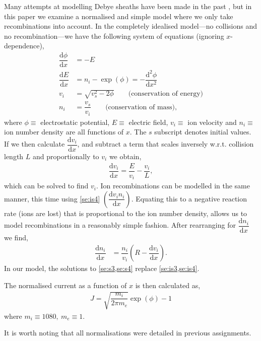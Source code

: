 \documentclass[aip,apl,reprint]{revtex4-1}
\newcommand{\difx}[1]{\dfrac{\mathrm{d}#1}{\mathrm{d}x}}
\newcommand{\ddifx}[1]{\dfrac{\mathrm{d}^{2}#1}{\mathrm{d}x^{2}}}
\begin{document}
	Many attempts at modelling Debye sheaths have been made in the past \cite{lpcs}, but in this paper we examine a normalised and simple model where we only take recombinations into account. In the completely idealised model---no collisions and no recombination---we have the following system of equations (ignoring $x$-dependence),
	\begin{subequations}
		\begin{align}
			\difx{\phi} &= -E \label{se:is1}\\
			\difx{E} &= n_{i} - \exp(\phi) = - \ddifx{\phi} \label{se:is2}\\
			v_{i} &= \sqrt{v_{s}^{2} - 2 \phi} \qquad \textrm{(conservation of energy)}\label{se:is3}\\
			n_{i} &= \dfrac{v_{s}}{v_{i}} \qquad \textrm{(conservation of mass)}\label{se:is4},
		\end{align}
	\end{subequations}
	where $\phi \equiv$ electrostatic potential, $E \equiv$ electric field, $v_{i} \equiv$ ion velocity and $n_{i} \equiv$ ion number density are all functions of $x$. The $s$ subscript denotes initial values. If we then calculate $\difx{v_{i}}$, and subtract a term that scales inversely w.r.t. collision length $L$ and proportionally to $v_{i}$ we obtain,
	\begin{align}
		\difx{v_{i}} = \dfrac{E}{v_{i}} - \dfrac{v_{i}}{L},\label{se:s3}
	\end{align}
	which can be solved to find $v_{i}$. Ion recombinations can be modelled in the same manner, this time using \cref{se:is4} $\left(\difx{v_{i} n_{i}}\right)$. Equating this to a negative reaction rate (ions are lost) that is proportional to the ion number density, allows us to model recombinations in a reasonably simple fashion. After rearranging for $\difx{n_{i}}$ we find,
	\begin{align}
		\difx{n_{i}} &= \dfrac{n_{i}}{v_{i}} \left(R - \difx{v_{i}}\right).\label{se:s4}
	\end{align}
	In our model, the solutions to \cref{se:s3,se:s4} replace \cref{se:is3,se:is4}.
	
	The normalised current as a function of $x$ is then calculated as,
	\begin{align}
		J = \sqrt{\dfrac{m_{i}}{2\pi m_{e}}} \exp(\phi) - 1 \label{s:curr}
	\end{align}
	where $m_{i} \equiv 1080,~m_{e} \equiv 1$.
	
	It is worth noting that all normalisations were detailed in previous assignments.
\end{document}
